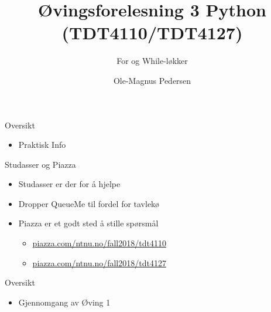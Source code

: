 \documentclass[screen, aspectratio=169]{beamer}
\title[Short title]{Øvingsforelesning 3 Python (TDT4110/TDT4127)}
\subtitle{For og While-løkker}
\author[O.M. Pedersen\\
]{Ole-Magnus Pedersen}
\institute[NTNU]{}
\date{}
\begin{document}
\begin{frame}
  \titlepage
\end{frame}


\begin{frame}{Oversikt}
	\begin{itemize}
		\item Praktisk Info
	\end{itemize}
\end{frame}

\begin{frame}{Studasser og Piazza}
	\begin{itemize}
		\item Studasser er der for å hjelpe
		\item Dropper QueueMe til fordel for tavlekø
		\vspace{1em}
		\item Piazza er et godt sted å stille spørsmål
		\begin{itemize}
			\item \href{piazza.com/ntnu.no/fall2018/tdt4110}{piazza.com/ntnu.no/fall2018/tdt4110}
			\item \href{piazza.com/ntnu.no/fall2018/tdt4127}{piazza.com/ntnu.no/fall2018/tdt4127}
		\end{itemize}
	\end{itemize}
\end{frame}

\iffalse
\begin{frame}[fragile]{Kahoot!}
	\begin{itemize}
		\item Tilbakemelding på øvingsopplegget
		\item Sjekke ut mulighet for å redusere til to paralleller
		\tiny \item \href{https://play.kahoot.it/#/k/09d6073f-6747-4f20-ac5d-ffdd2bbb8911}{Link}
	\end{itemize}
\end{frame}
\fi

\begin{frame}{Oversikt}
	\begin{itemize}
		\item Gjennomgang av Øving 1
	\end{itemize}
\end{frame}
\end{document}
